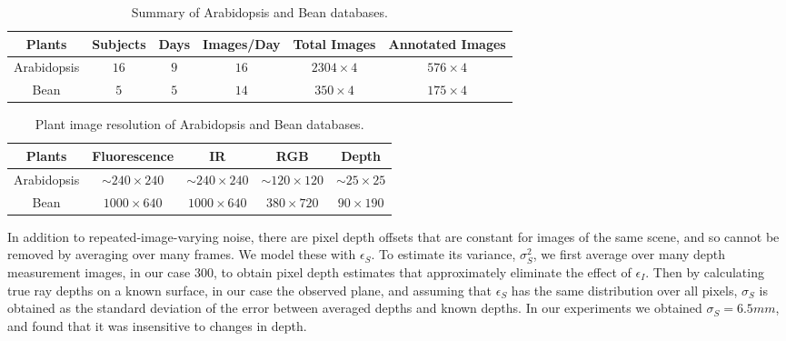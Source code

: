 \begin{table*}[t!]
\begin{center}
\caption{Summary of Arabidopsis and Bean databases.}
\label{tab:stat}
\begin{tabular}{c|c|c|c|c|c}
\hline
Plants & Subjects & Days & Images/Day & Total Images & Annotated Images \\
\hline
Arabidopsis & $16$ & $9$ & $16$ & $2304\times 4$ & $576\times 4$ \\
\hline
Bean & $5$ & $5$ & $14$ & $350\times 4$ & $175\times 4$ \\
\hline
\end{tabular}
\end{center}
\end{table*}



\begin{table*}
\begin{center}
\caption{Plant image resolution of Arabidopsis and Bean databases.}
\label{tab:resolution}
\begin{tabular}{c|c|c|c|c}
\hline
Plants & Fluorescence & IR & RGB & Depth \\
\hline
Arabidopsis & $\sim$$240\times240$ & $\sim$$240\times240$ & $\sim$$120\times120$ & $\sim$$25\times25$ \\
Bean & $1000\times640$ & $1000\times640$ & $380\times720$ & $90\times190$ \\
\hline
\end{tabular}
\end{center}
\end{table*}

In addition to repeated-image-varying noise, there are pixel depth offsets that are constant for images of the same scene, and so cannot be removed by averaging over many frames. We model these with $\epsilon_S$. To estimate its variance, $\sigma_S^2$, we first average over many depth measurement images, in our case 300, to obtain pixel depth estimates that approximately eliminate the effect of $\epsilon_I$. Then by calculating true ray depths on a known surface, in our case the observed plane, and assuming that $\epsilon_S$ has the same distribution over all pixels, $\sigma_S$ is obtained as the standard deviation of the error between averaged depths and known depths. In our experiments we obtained $\sigma_S=6.5mm$, and found that it was insensitive to changes in depth.



